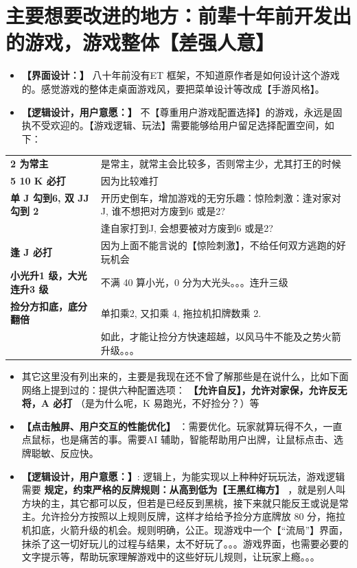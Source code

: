\documentclass[9pt, b5paper]{article}
\begin{document}
\section{主要想要改进的地方：前辈十年前开发出的游戏，游戏整体【差强人意】}
\label{sec:org697a571}
\begin{itemize}
\item \textbf{【界面设计：】} 八十年前没有ET 框架，不知道原作者是如何设计这个游戏的。感觉游戏的整体走桌面游戏风，要把菜单设计等改成【手游风格】。
\item \textbf{【逻辑设计，用户意愿：】} 不【尊重用户游戏配置选择】的游戏，永远是固执不受欢迎的。【游戏逻辑、玩法】需要能够给用户留足选择配置空间，如下：
\end{itemize}
\begin{center}
\begin{tabular}{ll}
\textbf{2 为常主} & 是常主，就常主会比较多，否则常主少，尤其打王的时候\\
\textbf{5 10 K 必打} & 因为比较难打\\
\textbf{单 J 勾到6, 双 JJ 勾到 2} & 开历史倒车，增加游戏的无穷乐趣：惊险刺激：逢对家对J, 谁不想把对方废到6 或是2?\\
 & 逢自家打到J, 会想要被对方废到6 或是2?\\
\textbf{逢 J 必打} & 因为上面不能言说的【惊险刺激】，不给任何双方逃跑的好玩机会\\
\textbf{小光升1 级，大光连升3 级} & 不满 40 算小光，0 分为大光头。。。连升三级\\
\textbf{捡分方扣底，底分翻倍} & 单扣乘2, 又扣乘 4, 拖拉机扣牌数乘 2.\\
 & 如此，才能让捡分方快速超越，以风马牛不能及之势火箭升级。。。\\
\end{tabular}
\end{center}
\begin{itemize}
\item 其它这里没有列出来的，主要是我现在还不曾了解那些是在说什么，比如下面网络上提到过的：提供六种配置选项： \textbf{【允许自反】，允许对家保，允许反无将，A 必打} （是为什么呢，K 易跑光，不好捡分？）等
\item \textbf{【点击触屏、用户交互的性能优化】} ：需要优化。玩家就算玩得不久，一直点鼠标，也是痛苦的事。需要AI 辅助，智能帮助用户出牌，让鼠标点击、选牌聪敏、反应快。
\item \textbf{【逻辑设计，用户意愿：】}: 逻辑上，为能实现以上种种好玩玩法，游戏逻辑需要 \textbf{规定，约束严格的反牌规则：从高到低为【王黑红梅方】} ，就是别人叫方块的主，其它都可以反，但若是已经反到黑桃，接下来就只能反王或说是常主。允许捡分方按照以上规则反牌，这样才给给予捡分方底牌放 80 分，拖拉机扣底，火箭升级的机会。规则明确，公正。现游戏中一个【“流局”】界面，抹杀了这一切好玩儿的过程与结果，太不好玩了。。。游戏界面，也需要必要的文字提示等，帮助玩家理解游戏中的这些好玩儿规则，让玩家上瘾。。。
\end{itemize}
\end{document}

